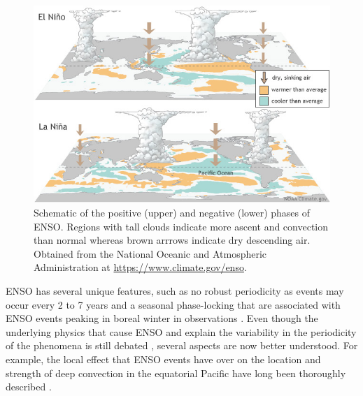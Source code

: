   
  
\begin{figure}[t!]
\centering
\includegraphics[width=\linewidth]{figures/ENSO}
\caption[El Niño Southern Oscillation and the Walker circulation]{Schematic of the positive (upper) and negative (lower) phases of ENSO. Regions with tall clouds indicate more ascent and convection than normal whereas brown arrrows indicate dry descending air. Obtained from the National Oceanic and Atmospheric Administration at \url{https://www.climate.gov/enso}. }
\label{fig:enso}
\end{figure}  
 ENSO has several unique features, such as no robust periodicity as events may occur every 2 to 7 years and a seasonal phase-locking that are associated with ENSO events peaking in boreal winter in observations \citep{wang2004}. Even though the underlying physics that cause ENSO and explain the variability in the periodicity of the phenomena is still debated \citep{wang2004,christensen2017}, several aspects are now better understood. 
For example, the local effect that ENSO events have over on the location and strength of deep convection in the equatorial Pacific have long been thoroughly described \citep{trenberth1997,neelin1998}. 

